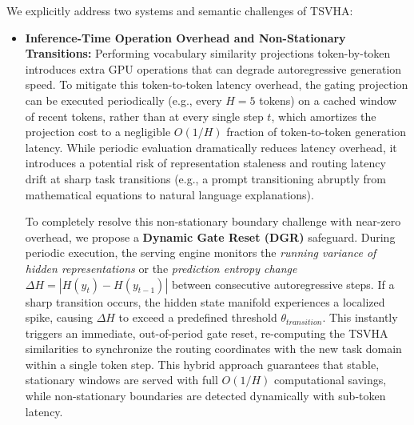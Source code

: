 We explicitly address two systems and semantic challenges of TSVHA:
\begin{itemize}
  \item \textbf{Inference-Time Operation Overhead and Non-Stationary Transitions:} Performing vocabulary similarity projections token-by-token introduces extra GPU operations that can degrade autoregressive generation speed. To mitigate this token-to-token latency overhead, the gating projection can be executed periodically (e.g., every $H = 5$ tokens) on a cached window of recent tokens, rather than at every single step $t$, which amortizes the projection cost to a negligible $O(1/H)$ fraction of token-to-token generation latency. While periodic evaluation dramatically reduces latency overhead, it introduces a potential risk of representation staleness and routing latency drift at sharp task transitions (e.g., a prompt transitioning abruptly from mathematical equations to natural language explanations). 

  To completely resolve this non-stationary boundary challenge with near-zero overhead, we propose a \textbf{Dynamic Gate Reset (DGR)} safeguard. During periodic execution, the serving engine monitors the \emph{running variance of hidden representations} or the \emph{prediction entropy change} $\Delta H = |H(y_t) - H(y_{t-1})|$ between consecutive autoregressive steps. If a sharp transition occurs, the hidden state manifold experiences a localized spike, causing $\Delta H$ to exceed a predefined threshold $\theta_{transition}$. This instantly triggers an immediate, out-of-period gate reset, re-computing the TSVHA similarities to synchronize the routing coordinates with the new task domain within a single token step. This hybrid approach guarantees that stable, stationary windows are served with full $O(1/H)$ computational savings, while non-stationary boundaries are detected dynamically with sub-token latency.


\end{itemize}
